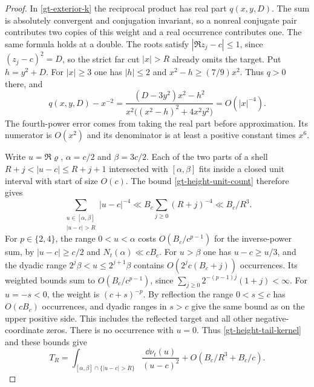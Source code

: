 \begin{proof}
In \eqref{gt-exterior-k} the reciprocal product has real part
\(q(x,y,D)\). The sum is absolutely convergent and conjugation
invariant, so a nonreal conjugate pair contributes two copies of
this weight and a real occurrence contributes one. The same formula
holds at a double. The roots satisfy
\(|\Re z_j-c|\le1\), since \((z_j-c)^2=D\), so the strict far cut
\(|x|>R\) already omits the target. Put \(h=y^2+D\). For
\(|x|\ge3\) one has \(|h|\le2\) and \(x^2-h\ge(7/9)x^2\).
Thus \(q>0\) there, and
\begin{equation}
 q(x,y,D)-x^{-2}
 =\frac{(D-3y^2)x^2-h^2}{x^2\bigl((x^2-h)^2+4x^2y^2\bigr)}
 =O(|x|^{-4}).
 \label{gt-height-tail-kernel}
\end{equation}
The fourth-power error comes from taking the real part before
approximation. Its numerator is \(O(x^2)\) and its denominator
is at least a positive constant times \(x^6\).

Write \(u=\Re\varrho\), \(\alpha=c/2\) and \(\beta=3c/2\).
Each of the two parts of a shell
\(R+j<|u-c|\le R+j+1\) intersected with \([\alpha,\beta]\)
fits inside a closed unit interval with start of size \(O(c)\).
The bound \eqref{gt-height-unit-count} therefore gives
\[
 \sum_{\substack{u\in[\alpha,\beta]\\ |u-c|>R}}
     |u-c|^{-4} \ll B_c\sum_{j\ge0}(R+j)^{-4}
 \ll B_c/R^3 .
\]
For \(p\in\{2,4\}\), the range \(0<u<\alpha\) costs
\(O(B_c/c^{p-1})\) for the inverse-power sum, by
\(|u-c|\ge c/2\) and \(N_t(\alpha)\ll cB_c\).
For \(u>\beta\) one has \(u-c\ge u/3\), and the dyadic range
\(2^j\beta<u\le2^{j+1}\beta\) contains
\(O(2^jc(B_c+j))\) occurrences. Its weighted bounds sum to
\(O(B_c/c^{p-1})\), since \(\sum_{j\ge0}2^{-(p-1)j}(1+j)<\infty\).
For \(u=-s<0\), the weight is \((c+s)^{-p}\). By reflection the
range \(0<s\le c\) has \(O(cB_c)\) occurrences, and dyadic ranges
in \(s>c\) give the same bound as on the upper positive side.
This includes the reflected target and all other negative-coordinate
zeros. There is no occurrence with \(u=0\). Thus
\eqref{gt-height-tail-kernel} and these bounds give
\begin{equation}
 T_R=\int_{[\alpha,\beta]\cap\{|u-c|>R\}}
         \frac{\dd\nu_t(u)}{(u-c)^2}
       +O(B_c/R^3+B_c/c).
 \label{gt-height-tail-central}
\end{equation}


\end{proof}
